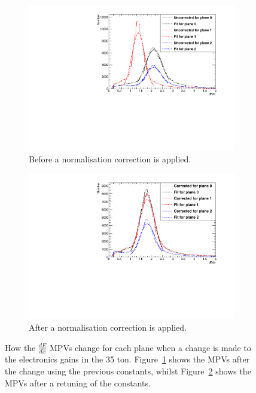 \begin{figure}[h!]
  \centering
  \begin{subfigure}{0.45\textwidth}
    \centering
    \includegraphics[width=\textwidth]{UnCorrectedCanvas}
    \caption{Before a normalisation correction is applied.}
    \label{fig:CaloTune_Before}
  \end{subfigure}
  \hspace{0.08\textwidth}
  \begin{subfigure}{0.45\textwidth}
    \centering
    \includegraphics[width=\textwidth]{CorrectedCanvas}
    \caption{After a normalisation correction is applied.}
    \label{fig:CaloTune_After}
  \end{subfigure}
  \caption[The tuning of the calorimetric constants in the 35 ton]
          {How the $\frac{dE}{dx}$ MPVs change for each plane when a change is made to the electronics gains in the 35 ton. Figure~\ref{fig:CaloTune_Before} shows the MPVs after the change using the previous constants, whilst Figure~\ref{fig:CaloTune_After} shows the MPVs after a retuning of the constants.}
          \label{fig:CaloTune}
\end{figure}
        
